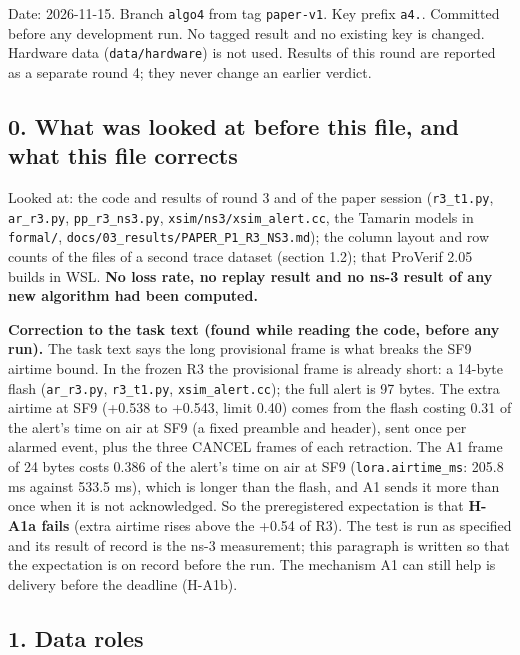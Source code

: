 


Date: 2026-11-15. Branch \texttt{algo4} from tag \texttt{paper-v1}. Key prefix \texttt{a4.}. Committed before any development run. No tagged result and no existing key is changed. Hardware data (\texttt{data/hardware}) is not used. Results of this round are reported as a separate round 4; they never change an earlier verdict.

\subsection*{0. What was looked at before this file, and what this file corrects}

Looked at: the code and results of round 3 and of the paper session (\texttt{r3\_t1.py}, \texttt{ar\_r3.py}, \texttt{pp\_r3\_ns3.py}, \texttt{xsim/ns3/xsim\_alert.cc}, the Tamarin models in \texttt{formal/}, \texttt{docs/03\_results/PAPER\_P1\_R3\_NS3.md}); the column layout and row counts of the files of a second trace dataset (section 1.2); that ProVerif 2.05 builds in WSL. \textbf{No loss rate, no replay result and no ns-3 result of any new algorithm had been computed.}

\textbf{Correction to the task text (found while reading the code, before any run).} The task text says the long provisional frame is what breaks the SF9 airtime bound. In the frozen R3 the provisional frame is already short: a 14-byte flash (\texttt{ar\_r3.py}, \texttt{r3\_t1.py}, \texttt{xsim\_alert.cc}); the full alert is 97 bytes. The extra airtime at SF9 (+0.538 to +0.543, limit 0.40) comes from the flash costing 0.31 of the alert's time on air at SF9 (a fixed preamble and header), sent once per alarmed event, plus the three CANCEL frames of each retraction. The A1 frame of 24 bytes costs 0.386 of the alert's time on air at SF9 (\texttt{lora.airtime\_ms}: 205.8 ms against 533.5 ms), which is longer than the flash, and A1 sends it more than once when it is not acknowledged. So the preregistered expectation is that \textbf{H-A1a fails} (extra airtime rises above the +0.54 of R3). The test is run as specified and its result of record is the ns-3 measurement; this paragraph is written so that the expectation is on record before the run. The mechanism A1 can still help is delivery before the deadline (H-A1b).

\subsection*{1. Data roles}

